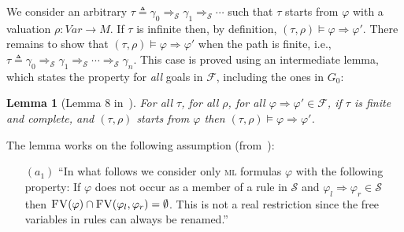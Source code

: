 \documentclass[conference]{IEEEtran}
\newenvironment{todo}{\medskip\hrule\smallskip\noindent}{\smallskip\hrule\medskip}
\newcommand{\vr}[1]{\begin{todo}\textcolor{blue}{Vlad:}\\ \color{orange}{#1}\color{black}\end{todo}}
\newcommand{\vr}[1]{}
\newcommand{\M}{\mathit{M}}
\newcommand{\eqbydef}{\triangleq}
\newcommand{\F}{\mathcal{F}}
\renewcommand{\S}{\mathcal{S}}
\newcommand{\tran}[2]{\Ra^{\!#1}_{\!#2}}
\newcommand{\Ra}{\Rightarrow}
\newcommand{\Var}{\mathit{Var}}
\newcommand{\FreeVars}{\mathit{\textsc{FV}}}
\newcommand{\ML}{\textsc{ml}\xspace}
\newcommand{\rrule}[2]{{#1} \Ra{#2}}
\newtheorem{lemma}{Lemma}
\begin{document}
We consider an arbitrary $\tau \eqbydef \gamma_0 \tran{}{\S} \gamma_1 \tran{}{\S} \cdots$ such that $\tau$ starts from $\varphi$ with a valuation $\rho:\Var \to \M$.
If $\tau$ is infinite then, by definition, $(\tau, \rho)\models\rrule{\varphi}{\varphi'}$.
There remains to show that $(\tau, \rho)\models\rrule{\varphi}{\varphi'}$ when the path is finite, i.e., $\tau \eqbydef \gamma_0 \tran{}{\S} \gamma_1 \tran{}{\S} \cdots \tran{}{\S} \gamma_n$. 
This case  is proved using an intermediate lemma, which states the property for \emph{all} goals in $\F$, including the ones in $G_0$:

\begin{lemma}[Lemma 8 in~\cite{lucanu-rusu-arusoaie-nowak-LRC2015}]
\label{lem:main}
For all $\tau$, for all $\rho$, for all $\rrule{\varphi}{\varphi'}\in\F$, if $\tau$ is finite and complete, and $(\tau,\rho)$ starts from $\varphi$ then $(\tau,\rho)\models \rrule{\varphi}{\varphi'}$.
\end{lemma}

\noindent
The lemma works on the following assumption (from~\cite{lucanu-rusu-arusoaie-nowak-LRC2015}):\\[1ex]
\hspace*{1ex}
\begin{minipage}{\textwidth}
\label{asm:disjoint}
\it
\begin{itemize}
\item[$(a_1)$] 
``In what follows we consider only \ML formulas $\varphi$ with the following property: If $\varphi$ does not occur as a member of a rule in $\S$ and $\rrule{\varphi_l}{\varphi_r}\in \S$ then $\FreeVars(\varphi) \cap \FreeVars(\varphi_l, \varphi_r) = \emptyset$. This is not a real restriction since the free variables in rules can always be renamed.''\\
\end{itemize}
\end{minipage}

\end{document}
